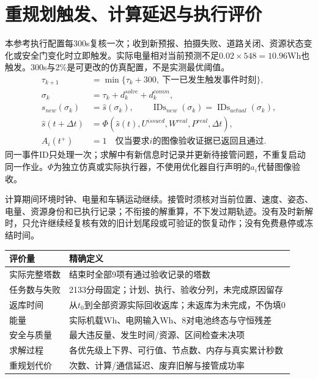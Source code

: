 \section{重规划触发、计算延迟与执行评价}
\noindent 本参考执行配置每300s复核一次；收到新预报、拍摄失败、道路关闭、资源状态变化或安全门变化时立即触发。实际电量相对当前预测不足$0.02\times548=10.96$Wh也触发。300s与2\%是可更改的仿真配置，不是实测最优阈值。
\begin{align}
 \tau_{k+1}&=\min\{\tau_k+300,\ \text{下一已发生触发事件时刻}\},\\
 \sigma_k&=\tau_k+d_k^{solve}+d_k^{comm},\label{eng:eq:takeover}\\
 s_{new}(\sigma_k)&=\widehat s(\sigma_k),\qquad
 \operatorname{IDs}_{new}(\sigma_k)=\operatorname{IDs}_{actual}(\sigma_k),\\
 \widehat s(t+\Delta t)&=\Phi(\widehat s(t),U^{issued},W^{real},P^{real},\Delta t),
 \label{eng:eq:execution}\\
 A_i(t^+)&=1\quad\text{仅当要求$i$的图像验收证据已返回且通过}.
 \label{eng:eq:taskhistory}
\end{align}
\noindent 同一事件ID只处理一次；求解中有新信息时记录并更新待接管问题，不重复启动同一作业。$\Phi$为独立仿真或实际执行器，不使用优化器自行声明的$a_i$代替图像验收。

\noindent 计算期间环境时钟、电量和车辆运动继续。接管时须核对当前位置、速度、姿态、电量、资源身份和已执行记录；不衔接的解重算，不下发过期轨迹。没有及时新解时，只允许继续经复核有效的旧计划尾段或可验证的恢复动作；没有免费悬停或冻结时间。
\begin{center}\small
\begin{tabular}{p{.28\linewidth}p{.62\linewidth}}\toprule
评价量 & 精确定义\\\midrule
实际完整塔数 & 结束时全部9项有通过验收记录的塔数\\
任务数与失败 & 2133分母固定；计划、执行、验收分列，未完成原因留存\\
返库时间 & 从$t_0$到全部资源实际回收返库；未返库为未完成，不伪填0\\
能量 & 实际机载Wh、电网输入Wh、8对电池终态与守恒残差\\
安全与质量 & 最大违反量、发生时间/资源、区间检查未决项\\
求解过程 & 各优先级上下界、可行值、节点数、内存与真实累计秒数\\
重规划代价 & 次数、计算/通信延迟、废弃旧解与接管成功率\\\bottomrule
\end{tabular}\end{center}
\clearpage

